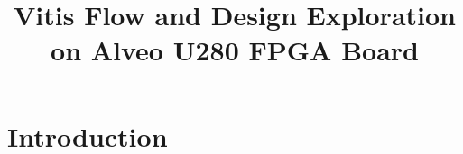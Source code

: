 \documentclass[11pt, final, conference, letterpaper, twocolumn]{IEEEtran}[2015/08/26]
\begin{document}

\title{Vitis Flow and Design Exploration on Alveo U280 FPGA Board}

\author{%
}


\maketitle

%
%

%

\section{Introduction}
\label{sec:introduction}
\end{document}
